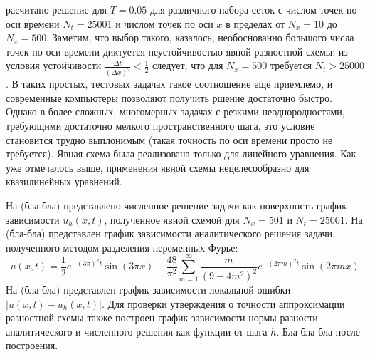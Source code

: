 расчитано решение для $T = 0.05$ для различного набора сеток с числом точек по оси времени $N_t = 25001$ и числом точек по оси $x$ в пределах от $N_x = 10$ до $N_x = 500$.
Заметим, что выбор такого, казалось, необоснованно большого числа точек по оси времени диктуется неустойчивостью явной разностной схемы: из условия устойчивости $\frac{\Delta t}{(\Delta x)^2} < \frac{1}{2}$ следует, что для $N_x = 500$ требуется $N_t > 25000$.
В таких простых, тестовых задачах такое соотношение ещё приемлемо, и современные компьютеры позволяют получить ршение достаточно быстро.
Однако в более сложных, многомерных задачах с резкими неоднородностями, требующими достаточно мелкого пространственного шага, это условие становится трудно выплонимым (такая точность по оси времени просто не требуется).
Явная схема была реализована только для линейного уравнения.
Как уже отмечалось выше, применения явной схемы нецелесообразно для квазилинейных уравнений.

На (бла-бла) представлено численное решение задачи как поверхность-график зависимости $u_h(x, t)$, полученное явной схемой для $N_x = 501$ и $N_t = 25001$.
На (бла-бла) представлен график зависимости аналитического решения задачи, полученного методом разделения переменных Фурье:
\begin{equation*}
    u(x, t) = \frac{1}{2}e^{-(3\pi)^2 t}\sin (3\pi x) - \frac{48}{\pi^2}\sum\limits_{m=1}^{\infty} \frac{m}{(9 - 4m^2)^2}e^{-(2\pi m)^2 t}\sin (2\pi m x)
\end{equation*}
На (бла-бла) представлен график зависимости локальной ошибки $|u(x, t) - u_h(x, t)|$.
Для проверки утверждения о точности аппроксимации разностной схемы также построен график зависимости нормы разности аналитического и численного решения как функции от шага $h$.
Бла-бла-бла после построения.

